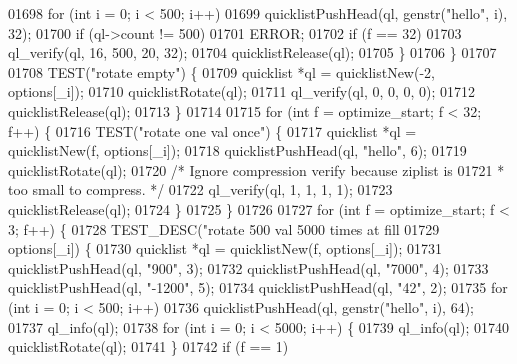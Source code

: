 \begin{DoxyCode}
{{{{{{{{{{{{{{{{{{{{{{{{{{{{{{{{{{{{{{{{01698                 \textcolor{keywordflow}{for} (\textcolor{keywordtype}{int} i = 0; i < 500; i++)
01699                     quicklistPushHead(ql, genstr(\textcolor{stringliteral}{"hello"}, i), 32);
01700                 \textcolor{keywordflow}{if} (ql->count != 500)
01701                     ERROR;
01702                 \textcolor{keywordflow}{if} (f == 32)
01703                     ql\_verify(ql, 16, 500, 20, 32);
01704                 quicklistRelease(ql);
01705             \}
01706         \}
01707 
01708         TEST(\textcolor{stringliteral}{"rotate empty"}) \{
01709             quicklist *ql = quicklistNew(-2, options[\_i]);
01710             quicklistRotate(ql);
01711             ql\_verify(ql, 0, 0, 0, 0);
01712             quicklistRelease(ql);
01713         \}
01714 
01715         \textcolor{keywordflow}{for} (\textcolor{keywordtype}{int} f = optimize\_start; f < 32; f++) \{
01716             TEST(\textcolor{stringliteral}{"rotate one val once"}) \{
01717                 quicklist *ql = quicklistNew(f, options[\_i]);
01718                 quicklistPushHead(ql, \textcolor{stringliteral}{"hello"}, 6);
01719                 quicklistRotate(ql);
01720                 \textcolor{comment}{/* Ignore compression verify because ziplist is}
01721 \textcolor{comment}{                 * too small to compress. */}
01722                 ql\_verify(ql, 1, 1, 1, 1);
01723                 quicklistRelease(ql);
01724             \}
01725         \}
01726 
01727         \textcolor{keywordflow}{for} (\textcolor{keywordtype}{int} f = optimize\_start; f < 3; f++) \{
01728             TEST\_DESC(\textcolor{stringliteral}{"rotate 500 val 5000 times at fill %
01729                       options[\_i]) \{
01730                 quicklist *ql = quicklistNew(f, options[\_i]);
01731                 quicklistPushHead(ql, \textcolor{stringliteral}{"900"}, 3);
01732                 quicklistPushHead(ql, \textcolor{stringliteral}{"7000"}, 4);
01733                 quicklistPushHead(ql, \textcolor{stringliteral}{"-1200"}, 5);
01734                 quicklistPushHead(ql, \textcolor{stringliteral}{"42"}, 2);
01735                 \textcolor{keywordflow}{for} (\textcolor{keywordtype}{int} i = 0; i < 500; i++)
01736                     quicklistPushHead(ql, genstr(\textcolor{stringliteral}{"hello"}, i), 64);
01737                 ql\_info(ql);
01738                 \textcolor{keywordflow}{for} (\textcolor{keywordtype}{int} i = 0; i < 5000; i++) \{
01739                     ql\_info(ql);
01740                     quicklistRotate(ql);
01741                 \}
01742                 \textcolor{keywordflow}{if} (f == 1)
}}}}}}}}}}}}}}}}}}}}}}}}}}}}}}}}}}}}}}}}}
\end{DoxyCode}
